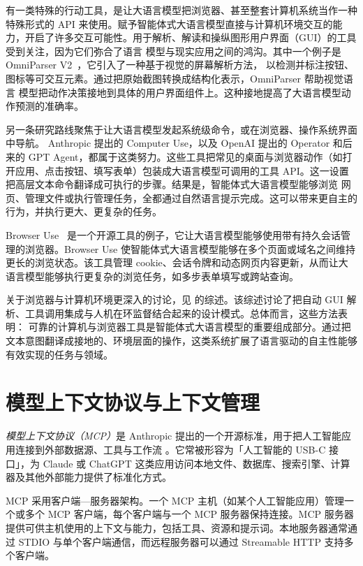 有一类特殊的行动工具，是让大语言模型把浏览器、甚至整套计算机系统当作一种特殊形式的 API 来使用。赋予智能体式大语言模型直接与计算机环境交互的能力，开启了许多交互可能性。用于解析、解读和操纵图形用户界面（GUI）的工具受到关注，因为它们弥合了语言
模型与现实应用之间的鸿沟。其中一个例子是 OmniParser V2~\citep{lu2024omniparserpurevisionbased}，它引入了一种基于视觉的屏幕解析方法，
以检测并标注按钮、图标等可交互元素。通过把原始截图转换成结构化表示，OmniParser 帮助视觉语言
模型把动作决策接地到具体的用户界面组件上。这种接地提高了大语言模型动作预测的准确率。

另一条研究路线聚焦于让大语言模型发起系统级命令，或在浏览器、操作系统界面中导航。
Anthropic 提出的 Computer Use，以及 OpenAI 提出的 Operator 和后来的 GPT Agent，都属于这类努力。这些工具把常见的桌面与浏览器动作（如打开应用、点击按钮、填写表单）包装成大语言模型可调用的工具 API。这一设置把高层文本命令翻译成可执行的步骤。结果是，智能体式大语言模型能够浏览
网页、管理文件或执行管理任务，全都通过自然语言提示完成。这可以带来更自主的行为，并执行更大、更复杂的任务。

Browser Use~\citep{browser_use2024} 是一个开源工具的例子，它让大语言模型能够使用带有持久会话管理的浏览器。Browser Use 使智能体式大语言模型能够在多个页面或域名之间维持更长的浏览状态。该工具管理 cookie、会话令牌和动态网页内容更新，从而让大语言模型能够执行更复杂的浏览任务，如多步表单填写或跨站查询。

关于浏览器与计算机环境更深入的讨论，见 \citet{wang2025guiagentsfoundationmodels} 的综述。该综述讨论了把自动 GUI 解析、工具调用集成与人机在环监督结合起来的设计模式。总体而言，这些方法表明：
可靠的计算机与浏览器工具是智能体式大语言模型的重要组成部分。通过把文本意图翻译成接地的、环境层面的操作，这类系统扩展了语言驱动的自主性能够有效实现的任务与领域。




\section{模型上下文协议与上下文管理}\label{sec:mcp}

\textit{模型上下文协议（MCP）}是 Anthropic 提出的一个开源标准，用于把人工智能应用连接到外部数据源、工具与工作流 \citep{xinyi2026mcp}。它常被形容为「人工智能的 USB-C 接口」，为 Claude 或 ChatGPT 这类应用访问本地文件、数据库、搜索引擎、计算器及其他外部能力提供了标准化方式。

MCP 采用客户端—服务器架构。一个 MCP 主机（如某个人工智能应用）管理一个或多个 MCP 客户端，每个客户端与一个 MCP 服务器保持连接。MCP 服务器提供可供主机使用的上下文与能力，包括工具、资源和提示词。本地服务器通常通过 STDIO 与单个客户端通信，而远程服务器可以通过 Streamable HTTP 支持多个客户端。

